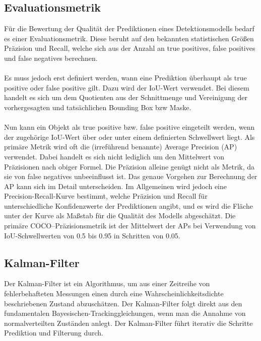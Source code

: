 \documentclass[runningheads]{llncs}
\begin{document}
\subsection{Evaluationsmetrik}
Für die Bewertung der Qualität der Prediktionen eines Detektionsmodells bedarf es einer Evaluationsmetrik. Diese beruht auf den bekannten statistischen Größen Präzision und Recall, welche sich aus der Anzahl an true positives, false positives und false negatives berechnen.\\\\
Es muss jedoch erst definiert werden, wann eine Prediktion überhaupt als true positive oder false positive gilt. Dazu wird der IoU-Wert verwendet. Bei diesem handelt es sich um dem Quotienten aus der Schnittmenge und Vereinigung der vorhergesagten und tatsächlichen Bounding Box bzw Maske.\\\\
Nun kann ein Objekt als true positive bzw. false positive eingeteilt werden, wenn der zugehörige IoU-Wert über oder unter einem definierten Schwellwert liegt. Als primäre Metrik wird oft die (irreführend benannte) Average Precision (AP) verwendet. Dabei handelt es sich nicht lediglich um den Mittelwert von Präzisionen nach obiger Formel. Die Präzision alleine genügt nicht als Metrik, da sie von false negatives unbeeinflusst ist. Das genaue Vorgehen zur Berechnung der AP kann sich im Detail unterscheiden. Im Allgemeinen wird jedoch eine Precision-Recall-Kurve bestimmt, welche Präzision und Recall für unterschiedliche Konfidenzwerte der Prediktionen angibt, und  es wird die Fläche unter der Kurve als Maßstab für die Qualität des Modells abgeschätzt.\cite{Metriken} Die primäre COCO--Präzisionsmetrik ist der Mittelwert der APs bei Verwendung von IoU-Schwellwerten von 0.5 bis 0.95 in Schritten von 0.05.\cite{COCO-Metrik}

\subsection{Kalman-Filter}
Der Kalman-Filter ist ein Algorithmus, um aus einer Zeitreihe von fehlerbehafteten Messungen einen durch eine Wahrscheinlichkeitsdichte beschriebenen Zustand abzuschätzen. Der Kalman-Filter folgt direkt aus den fundamentalen Bayesischen-Trackinggleichungen, wenn man die Annahme von normalverteilten Zuständen anlegt. Der Kalman-Filter führt iterativ die Schritte Prediktion und Filterung durch.
\end{document}
